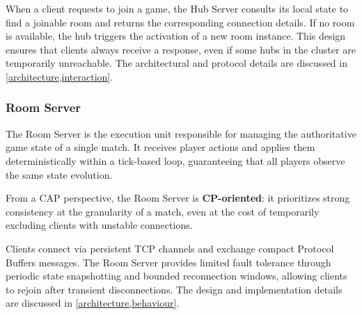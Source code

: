 When a client requests to join a game, the Hub Server consults its local state to find a joinable room and returns the corresponding connection details.
If no room is available, the hub triggers the activation of a new room instance.
This design ensures that clients always receive a response, even if some hubs in the cluster are temporarily unreachable.
The architectural and protocol details are discussed in \cref{architecture,interaction}.

\subsubsection{Room Server}

The Room Server is the execution unit responsible for managing the authoritative game state of a single match.
It receives player actions and applies them deterministically within a tick-based loop, guaranteeing that all players observe the same state evolution.

From a CAP perspective, the Room Server is \textbf{CP-oriented}: it prioritizes strong consistency at the granularity of a match, even at the cost of temporarily excluding clients with unstable connections.

Clients connect via persistent TCP channels and exchange compact Protocol Buffers messages.
The Room Server provides limited fault tolerance through periodic state snapshotting and bounded reconnection windows, allowing clients to rejoin after transient disconnections.
The design and implementation details are discussed in \cref{architecture,behaviour}.